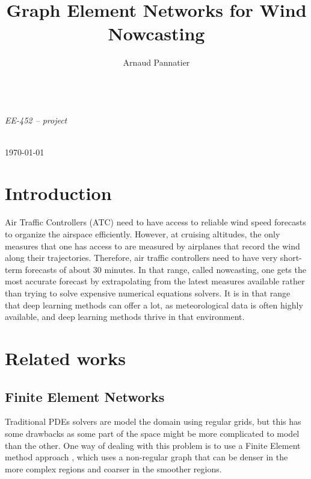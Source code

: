 \documentclass[a4paper,10pt]{article}
\title{Graph Element Networks for Wind Nowcasting}
\author{Arnaud Pannatier}
\begin{document}
\centering
\vspace*{0cm}
{\fontsize{35}{60}\selectfont \bfseries \thetitle } \\
\vspace{1cm}
\Large \textit{EE-452 -- project} \\
\vspace{0.5cm}
\normalfont
\Large \theauthor \\
\vspace{0.5cm}

\small\today

\normalfont\normalsize

\justifying

\section{Introduction}

Air Traffic Controllers (ATC) need to have access to reliable wind speed forecasts to organize the airspace efficiently. However, at cruising altitudes, the only measures that one has access to are measured by airplanes that record the wind along their trajectories. Therefore, air traffic controllers need to have very short-term forecasts of about 30 minutes. In that range, called nowcasting, one gets the most accurate forecast by extrapolating from the latest measures available rather than trying to solve expensive numerical equations solvers. It is in that range that deep learning methods can offer a lot, as meteorological data is often highly available, and deep learning methods thrive in that environment.

\section{Related works}

\subsection{Finite Element Networks}

Traditional PDEs solvers are model the domain using regular grids, but this has some drawbacks as some part of the space might be more complicated to model than the other. One way of dealing with this problem is to use a Finite Element method approach \cite{hughes2012finite}, which uses a non-regular graph that can be denser in the more complex regions and coarser in the smoother regions.
\end{document}
